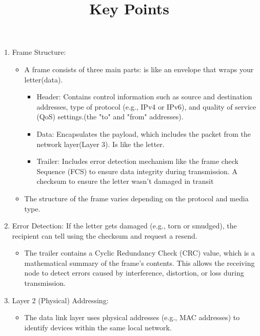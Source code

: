 \documentclass[a4paper,11pt]{article}
\begin{document}
\title{Key Points}
\begin{enumerate}
    \item Frame Structure:\\
    \begin{itemize}
        \item A frame consists of three main parts: is like an envelope that wraps your letter(data).\\
        \begin{itemize}
            \item Header: Contains control information such as source and destination addresses, type of protocol (e.g., IPv4 or IPv6), and quality of service (QoS) settings.(the "to" and "from" addresses).\\
            \item Data: Encapsulates the payload, which includes the packet from the network layer(Layer 3). Is like the letter.\\
            \item Trailer: Includes error detection mechanism like the frame check Sequence (FCS)  to ensure data integrity during transmission. A checksum to ensure the letter wasn't damaged in transit\\
        \end{itemize}
        \item The structure of the frame varies depending on the protocol and media type.\\
    \end{itemize}
    \item Error Detection: If the letter gets damaged (e.g., torn or smudged), the recipient can tell using the checksum and request a resend.\\
    \begin{itemize}
        \item The trailer contains a Cyclic Redundancy Check (CRC) value, which is a mathematical summary of the frame's contents. This allows the receiving node to detect errors caused by interference, distortion, or loss during transmission.\\
    \end{itemize}
    \item Layer 2 (Physical) Addressing:\\
    \begin{itemize}
        \item The data link layer uses physical addresses (e.g., MAC addresses) to identify devices within the same local network.\\

\end{itemize}
\end{enumerate}
\end{document}
